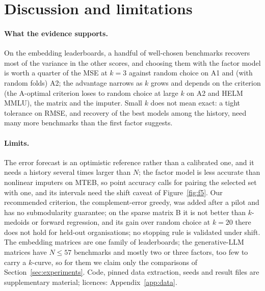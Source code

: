 \section{Discussion and limitations}
\label{sec:discussion}
\paragraph{What the evidence supports.}
On the embedding leaderboards, a handful of well-chosen benchmarks recovers most of the variance in the other scores, and choosing them with the factor model is worth a quarter of the MSE at $k=3$ against random choice on A1 and (with random folds) A2; the advantage narrows as $k$ grows and depends on the criterion (the A-optimal criterion loses to random choice at large $k$ on A2 and HELM MMLU), the matrix and the imputer.
Small $k$ does not mean exact: a tight tolerance on RMSE, and recovery of the best models among the history, need many more benchmarks than the first factor suggests.

\paragraph{Limits.}
The error forecast is an optimistic reference rather than a calibrated one, and it needs a history several times larger than $N$; the factor model is less accurate than nonlinear imputers on MTEB, so point accuracy calls for pairing the selected set with one, and its intervals need the shift caveat of Figure~\ref{fig:f5}.
Our recommended criterion, the complement-error greedy, was added after a pilot and has no submodularity guarantee; on the sparse matrix B it is not better than $k$-medoids or forward regression, and its gain over random choice at $k=20$ there does not hold for held-out organisations; no stopping rule is validated under shift.
The embedding matrices are one family of leaderboards; the generative-LLM matrices have $N\le57$ benchmarks and mostly two or three factors, too few to carry a $k$-curve, so for them we claim only the comparisons of Section~\ref{sec:experiments}.
Code, pinned data extraction, seeds and result files are supplementary material; licences: Appendix~\ref{app:data}.
